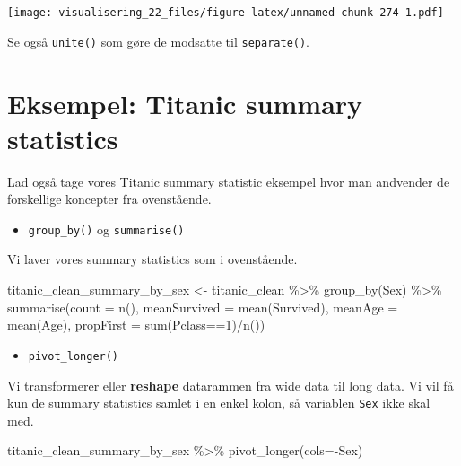\documentclass[
]{book}
\newenvironment{Shaded}{\begin{snugshade}}{\end{snugshade}}
\newcommand{\AttributeTok}[1]{\textcolor[rgb]{0.77,0.63,0.00}{#1}}
\newcommand{\DecValTok}[1]{\textcolor[rgb]{0.00,0.00,0.81}{#1}}
\newcommand{\FunctionTok}[1]{\textcolor[rgb]{0.00,0.00,0.00}{#1}}
\newcommand{\NormalTok}[1]{#1}
\newcommand{\OtherTok}[1]{\textcolor[rgb]{0.56,0.35,0.01}{#1}}
\newcommand{\SpecialCharTok}[1]{\textcolor[rgb]{0.00,0.00,0.00}{#1}}
\providecommand{\tightlist}{%
  \setlength{\itemsep}{0pt}\setlength{\parskip}{0pt}}
\begin{document}
\texttt{[image: visualisering\_22\_files/figure-latex/unnamed-chunk-274-1.pdf]}

Se også \texttt{unite()} som gøre de modsatte til \texttt{separate()}.

\hypertarget{eksempel-titanic-summary-statistics}{%
\section{Eksempel: Titanic summary statistics}\label{eksempel-titanic-summary-statistics}}

Lad også tage vores Titanic summary statistic eksempel hvor man andvender de forskellige koncepter fra ovenstående.

\begin{itemize}
\tightlist
\item
  \texttt{group\_by()} og \texttt{summarise()}
\end{itemize}

Vi laver vores summary statistics som i ovenstående.

\begin{Shaded}
\begin{Highlighting}[]
\NormalTok{titanic\_clean\_summary\_by\_sex }\OtherTok{\textless{}{-}}\NormalTok{ titanic\_clean }\SpecialCharTok{\%\textgreater{}\%}  
  \FunctionTok{group\_by}\NormalTok{(Sex) }\SpecialCharTok{\%\textgreater{}\%} 
  \FunctionTok{summarise}\NormalTok{(}\AttributeTok{count =} \FunctionTok{n}\NormalTok{(),}
            \AttributeTok{meanSurvived =} \FunctionTok{mean}\NormalTok{(Survived),}
            \AttributeTok{meanAge =} \FunctionTok{mean}\NormalTok{(Age),}
            \AttributeTok{propFirst =} \FunctionTok{sum}\NormalTok{(Pclass}\SpecialCharTok{==}\DecValTok{1}\NormalTok{)}\SpecialCharTok{/}\FunctionTok{n}\NormalTok{())}
\end{Highlighting}
\end{Shaded}

\begin{itemize}
\tightlist
\item
  \texttt{pivot\_longer()}
\end{itemize}

Vi transformerer eller \textbf{reshape} datarammen fra wide data til long data. Vi vil få kun de summary statistics samlet i en enkel kolon, så variablen \texttt{Sex} ikke skal med.

\begin{Shaded}
\begin{Highlighting}[]
\NormalTok{titanic\_clean\_summary\_by\_sex }\SpecialCharTok{\%\textgreater{}\%} \FunctionTok{pivot\_longer}\NormalTok{(}\AttributeTok{cols=}\SpecialCharTok{{-}}\NormalTok{Sex)}
\end{Highlighting}
\end{Shaded}
\end{document}
